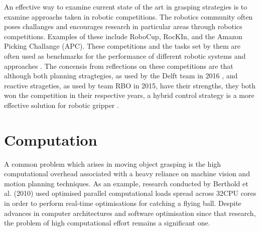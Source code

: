 
An effective way to examine current state of the art in grasping strategies is to examine approachs taken in robotic competitions. The robotics community often poses challanges and encourages research in particular areas through robotics competitions. Examples of these include RoboCup, RocKIn, and the Amazon Picking Challange (APC). These competitions and the tasks set by them are often used as benchmarks for the performance of different robotic systems and approaches \cite{CompetitionsAsBenchmarks}. The concensis from reflections on these competitions are that although both planning stragtegies, as used by the Delft team in 2016 \cite{Delft}, and reactive strageties, as used by team RBO in 2015, have their strengths, they both won the competition in their respective years, a hybrid control strategy is a more effective solution for robotic gripper \cite{APCObservations}.

\section{Computation}
A common problem which arises in moving object grasping is the high computational overhead associated with a heavy reliance on machine vision and motion planning techniques\cite{KinematicallyOptimal,Eppner2018}. As an example, research conducted by Berthold et al. (2010) \cite{KinematicallyOptimal} used optimised parallel computational loads spread across 32CPU cores in order to perform real-time optimisations for catching a flying ball. Despite advances in computer architectures and software optimisation since that research, the problem of high computational effort remains a significant one. 

